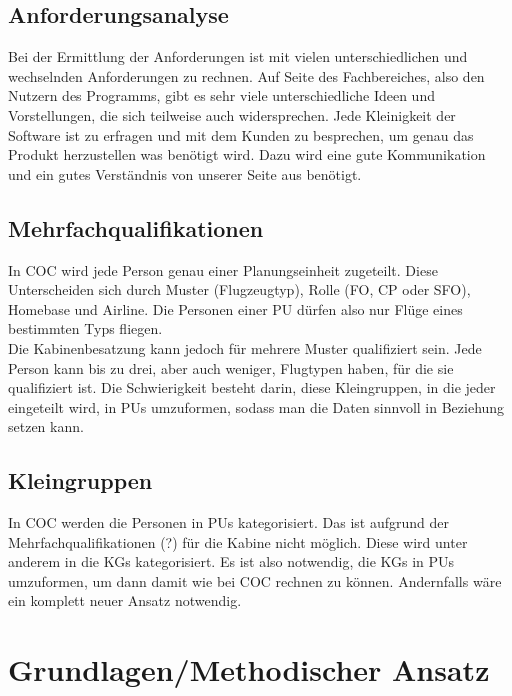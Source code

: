 \documentclass [12pt, a4paper, oneside, titlepage, ngerman]{article}
\begin{document}
\subsection{Anforderungsanalyse}
Bei der Ermittlung der Anforderungen ist mit vielen unterschiedlichen und wechselnden Anforderungen zu rechnen. Auf Seite des Fachbereiches, also den Nutzern des Programms, gibt es sehr viele unterschiedliche Ideen und Vorstellungen, die sich teilweise auch widersprechen. Jede Kleinigkeit der Software ist zu erfragen und mit dem Kunden zu besprechen, um genau das Produkt herzustellen was benötigt wird. Dazu wird eine gute Kommunikation und ein gutes Verständnis von unserer Seite aus benötigt.

\subsection{Mehrfachqualifikationen}
In COC wird jede Person genau einer Planungseinheit zugeteilt. Diese Unterscheiden sich durch Muster (Flugzeugtyp), Rolle (FO, CP oder SFO), Homebase und Airline. Die Personen einer PU dürfen also nur Flüge eines bestimmten Typs fliegen. \\
Die Kabinenbesatzung kann jedoch für mehrere Muster qualifiziert sein. Jede Person kann bis zu drei, aber auch weniger, Flugtypen haben, für die sie qualifiziert ist. Die Schwierigkeit besteht darin, diese Kleingruppen, in die jeder eingeteilt wird, in PUs umzuformen, sodass man die Daten sinnvoll in Beziehung setzen kann.

\subsection{Kleingruppen}
In COC werden die Personen in PUs kategorisiert. Das ist aufgrund der Mehrfachqualifikationen (?) für die Kabine nicht möglich. Diese wird unter anderem in die KGs kategorisiert. Es ist also notwendig, die KGs in PUs umzuformen, um dann damit wie bei COC rechnen zu können. Andernfalls wäre ein komplett neuer Ansatz notwendig.

\newpage

\section {Grundlagen/Methodischer Ansatz}
\end{document}
